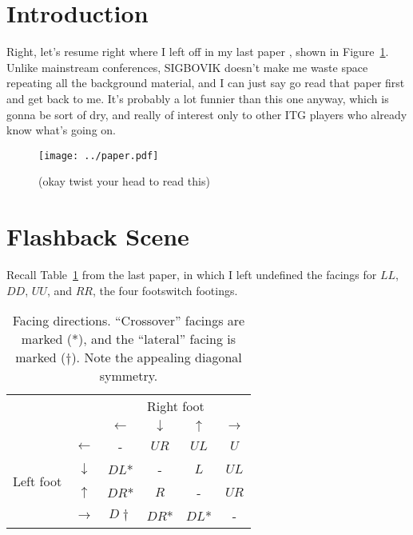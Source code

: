 \documentclass[10pt]{sigplanconf}
\begin{document}
\section{Introduction}

Right, let's resume right where I left off in my last paper \cite{turniness}, shown in Figure~\ref{fig:you-stutid-fuckass}.
Unlike mainstream conferences, SIGBOVIK doesn't make me waste space repeating all the background material,
and I can just say go read that paper first and get back to me.
It's probably a lot funnier than this one anyway, which is gonna be sort of dry,
and really of interest only to other ITG players who already know what's going on.

\begin{figure}[h]
	\hspace{-2em}\texttt{[image: ../paper.pdf]}
	\caption{(okay twist your head to read this)}
	\label{fig:you-stutid-fuckass}
\end{figure}



\section{Flashback Scene}

Recall Table~\ref{tab:facing} from the last paper, in which I left undefined the facings for $LL$, $DD$, $UU$, and $RR$, the four footswitch footings.

\begin{table}[h]
	\begin{center}
	\begin{tabular}{cc|cccc}
		& & \multicolumn{4}{c}{Right foot} \\
		& & $\leftarrow$ & $\downarrow$ & $\uparrow$ & $\rightarrow$ \\
		\hline
		\multirow{4}{*}{Left foot}
		& $\leftarrow$  & - & $UR$ & $UL$ & $U$ \\
		& $\downarrow$  & $DL$* & - & $L$ & $UL$ \\
		& $\uparrow$    & $DR$* & $R$ & - & $UR$ \\
		& $\rightarrow$ & $D\dagger$ & $DR$* & $DL$* & - \\

	\end{tabular}
	\end{center}
	\caption{Facing directions. ``Crossover'' facings are marked (*), and the ``lateral'' facing is marked ($\dagger$). Note the appealing diagonal symmetry.}
	\label{tab:facing}
\end{table}
\end{document}
